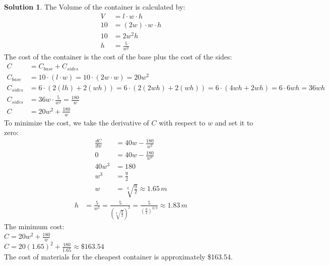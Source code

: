 \documentclass[11pt]{article}
\theoremstyle{definition}
\newtheorem*{solution}{Solution}
\begin{document}
\begin{solution}
    The Volume of the container is calculated by:
    \begin{align}
        V &= l \cdot w \cdot h \\
        10 &= (2w) \cdot w \cdot h \\
        10 &= 2w^2h \\
        h &= \frac{5}{w^2}
    \end{align}
    The cost of the container is the cost of the base plus the cost of the sides:
    \begin{align}
        C &= C_{base} + C_{sides} \\
        C_{base} &= 10 \cdot (l \cdot w) = 10 \cdot (2w \cdot w) = 20w^2 \\
        C_{sides} &= 6 \cdot (2(lh) + 2(wh)) = 6 \cdot (2(2wh) + 2(wh)) = 6 \cdot (4wh + 2wh) = 6 \cdot 6wh = 36wh \\
        C_{sides} &= 36w \cdot \frac{5}{w^2} = \frac{180}{w} \\
        C &= 20w^2 + \frac{180}{w}
    \end{align}
    To minimize the cost, we take the derivative of $C$ with respect to $w$ and set it to zero:
    \begin{align}
        \frac{dC}{dw} &= 40w - \frac{180}{w^2} \\
        0 &= 40w - \frac{180}{w^2} \\
        40w^3 &= 180 \\
        w^3 &= \frac{9}{2} \\
        w &= \sqrt[3]{\frac{9}{2}} \approx 1.65 \, m
    \end{align}
    \begin{align}
        h &= \frac{5}{w^2} = \frac{5}{(\sqrt[3]{\frac{9}{2}})^2} = \frac{5}{(\frac{9}{2})^{2/3}} \approx 1.83 \,m
    \end{align}
    The minimum cost: \\
    $C = 20w^2 + \frac{180}{w}$ \\
    $C = 20(1.65)^2 + \frac{180}{1.65} \approx \$163.54$ \\

    The cost of materials for the cheapest container is approximately \$163.54.
\end{solution}

\end{document}
